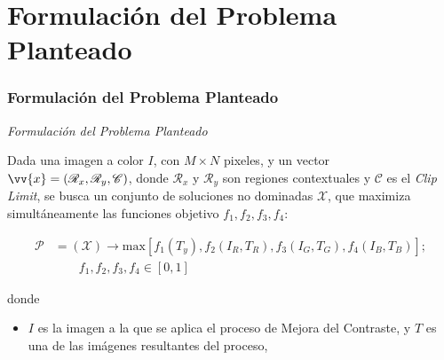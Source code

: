 \documentclass[usenames,dvipsnames]{beamer}
\begin{document}
\section{Formulación del Problema Planteado}

\begin{frame}
\frametitle{Formulación del Problema Planteado} 
\begin{exampleblock}{\textit{Formulación del Problema Planteado}}

Dada una imagen a color $I$, con $M \times N$ pixeles, y un vector $\vv{x}= (\mathscr{R}_x, \mathscr{R}_y, \mathscr{C})$, donde $\mathscr{R}_x$ y $\mathscr{R}_y$ son regiones contextuales y $\mathscr{C}$ es el \textit{Clip Limit}, se busca un conjunto de soluciones no dominadas $\mathscr{X}$, que maximiza simultáneamente las funciones objetivo $f_1,f_2,f_3,f_4$:

\begin{equation}
\begin{split}
\mathscr{P} &= (\mathscr{X}) \longrightarrow \text{max}[f_1(T_y),f_2(I_R,T_R),f_3(I_G,T_G),f_4(I_B,T_B)]; \\
            & \qquad f_1,f_2,f_3,f_4 \in [0,1]
\end{split}
\end{equation}

\end{exampleblock}

donde

\begin{itemize}
        \item $I$ es la imagen a la que se aplica el proceso de Mejora del Contraste, y $T$\label{symbol:imejorada} es una de las imágenes resultantes del proceso,
\end{itemize}


\end{frame}
\end{document}
